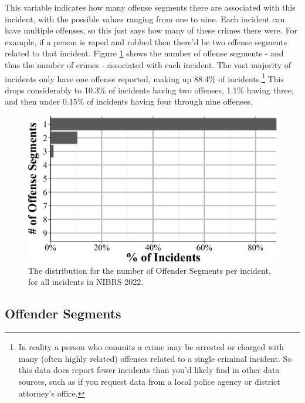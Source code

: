 \documentclass[
  12pt,
  openany]{book}
\begin{document}
This variable indicates how many offense segments there are associated with this incident, with the possible values ranging from one to nine. Each incident can have multiple offenses, so this just says how many of these crimes there were. For example, if a person is raped and robbed then there'd be two offense segments related to that incident. Figure \ref{fig:administrativeOffenseSegments} shows the number of offense segments - and thus the number of crimes - associated with each incident. The vast majority of incidents only have one offense reported, making up 88.4\% of incidents.\footnote{In reality a person who commits a crime may be arrested or charged with many (often highly related) offenses related to a single criminal incident. So this data does report fewer incidents than you'd likely find in other data sources, such as if you request data from a local police agency or district attorney's office.} This drops considerably to 10.3\% of incidents having two offenses, 1.1\% having three, and then under 0.15\% of incidents having four through nine offenses.

\begin{figure}

{\centering \includegraphics[width=0.9\linewidth]{12_nibrs_administrative_files/figure-latex/administrativeOffenseSegments-1} 

}

\caption{The distribution for the number of Offender Segments per incident, for all incidents in NIBRS 2022.}\label{fig:administrativeOffenseSegments}
\end{figure}

\subsection{Offender Segments}\label{offender-segments}
\end{document}
